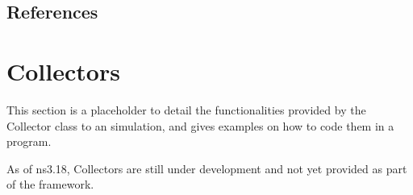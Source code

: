 \documentclass[letterpaper,10pt,english]{sphinxmanual}
\begin{document}
\begin{sphinxVerbatim}[commandchars=\\\{\}]
       
         
    
           
             
        
         

          
        
        
\end{sphinxVerbatim}


\subsection{References}
\label{\detokenize{probe:references}}

\section{Collectors}
\label{\detokenize{collector:collectors}}\label{\detokenize{collector::doc}}
This section is a placeholder to detail the functionalities provided by
the Collector
class to an  simulation, and gives examples on how to code them
in a program.

 As of ns\sphinxhyphen{}3.18, Collectors are still under development and
not yet provided as part of the framework.
\end{document}
